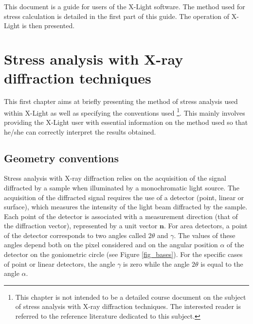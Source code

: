 \documentclass[french,a4paper]{report}
\begin{document}
This document is a guide for users of the X-Light software. The method used for stress calculation is detailed in the first part of this guide. The operation of X-Light is then presented. 
    

\chapter{Stress analysis with X-ray diffraction techniques}

This first chapter aims at briefly presenting the method of stress analysis used within X-Light as well as specifying the conventions used \footnote{This chapter is not intended to be a detailed course document on the subject of stress analysis with X-ray diffraction techniques. The interested reader is referred to the reference literature dedicated to this subject.}. This mainly involves providing the X-Light user with essential information on the method used so that he/she can correctly interpret the results obtained. 


\section{Geometry conventions}

Stress analysis with X-ray diffraction relies on the acquisition of the signal diffracted by a sample when illuminated by a monochromatic light source. The acquisition of the diffracted signal requires the use of a detector (point, linear or surface), which measures the intensity of the light beam diffracted by the sample. Each point of the detector is associated with a measurement direction (that of the diffraction vector), represented by a unit vector $\boldsymbol n$. For area detectors, a point of the detector corresponds to two angles called $2 \theta$ and $\gamma$. The values of these angles depend both on the pixel considered and on the angular position $\alpha$ of the detector on the goniometric circle (see Figure \ref{fig_bases}). For the specific cases of point or linear detectors, the angle $\gamma$ is zero while the angle $2 \theta$ is equal to the angle $\alpha$. 
\end{document}
